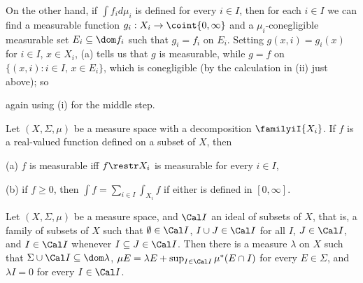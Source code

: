 {

\medskip

 On the other hand, if $\int f_id\mu_i$ is defined for
every $i\in I$, then for each $i\in I$ we can find a measurable function
$g_i:X_i\to\coint{0,\infty}$ and a $\mu_i$-conegligible measurable set
$E_i\subseteq\dom f_i$ such that $g_i=f_i$ on $E_i$.   Setting
$g(x,i)=g_i(x)$ for $i\in I$, $x\in X_i$, (a) tells us that $g$ is
measurable, while $g=f$ on $\{(x,i):i\in I,\,x\in E_i\}$, which is
conegligible (by the calculation in (ii) just above);  so


\noindent again using (i) for the middle step.
}%

Let $(X,\Sigma,\mu)$ be a measure space with a
decomposition $\familyiI{X_i}$.   If $f$ is a real-valued function
defined on a subset of $X$, then

(a) $f$ is measurable iff $f\restr X_i$ is measurable for every
$i\in I$,

(b) if $f\ge 0$, then $\int f=\sum_{i\in I}\int_{X_i}f$ if either is
defined in $[0,\infty]$.


 Let $(X,\Sigma,\mu)$ be a measure space, and $\Cal I$
an ideal of subsets of $X$, that is, a family of subsets of $X$ such that
$\emptyset\in\Cal I$, $I\cup J\in\Cal I$ for all $I$, $J\in\Cal I$, and
$I\in\Cal I$ whenever $I\subseteq J\in\Cal I$.   Then there is a measure
$\lambda$ on $X$ such that $\Sigma\cup\Cal I\subseteq\dom\lambda$,
$\mu E=\lambda E+\sup_{I\in\Cal I}\mu^*(E\cap I)$ for every $E\in\Sigma$,
and $\lambda I=0$ for every $I\in\Cal I$.

